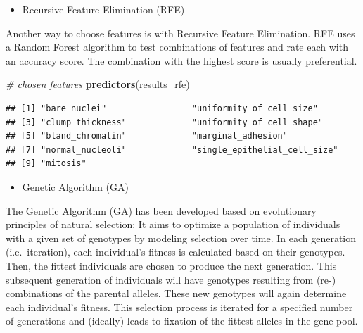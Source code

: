\documentclass[]{article}
\newenvironment{Shaded}{\begin{snugshade}}{\end{snugshade}}
\newcommand{\KeywordTok}[1]{\textcolor[rgb]{0.13,0.29,0.53}{\textbf{{#1}}}}
\newcommand{\DecValTok}[1]{\textcolor[rgb]{0.00,0.00,0.81}{{#1}}}
\newcommand{\StringTok}[1]{\textcolor[rgb]{0.31,0.60,0.02}{{#1}}}
\newcommand{\CommentTok}[1]{\textcolor[rgb]{0.56,0.35,0.01}{\textit{{#1}}}}
\newcommand{\NormalTok}[1]{{#1}}
\providecommand{\tightlist}{%
  \setlength{\itemsep}{0pt}\setlength{\parskip}{0pt}}
\begin{document}
\begin{Shaded}
\end{Shaded}

\begin{itemize}
\tightlist
\item
  Recursive Feature Elimination (RFE)
\end{itemize}

Another way to choose features is with Recursive Feature Elimination.
RFE uses a Random Forest algorithm to test combinations of features and
rate each with an accuracy score. The combination with the highest score
is usually preferential.

\begin{Shaded}
\begin{Highlighting}[]
\CommentTok{# chosen features}
\KeywordTok{predictors}\NormalTok{(results_rfe)}
\end{Highlighting}
\end{Shaded}

\begin{verbatim}
## [1] "bare_nuclei"                 "uniformity_of_cell_size"    
## [3] "clump_thickness"             "uniformity_of_cell_shape"   
## [5] "bland_chromatin"             "marginal_adhesion"          
## [7] "normal_nucleoli"             "single_epithelial_cell_size"
## [9] "mitosis"
\end{verbatim}

\begin{Shaded}
\end{Shaded}

\begin{itemize}
\tightlist
\item
  Genetic Algorithm (GA)
\end{itemize}

The Genetic Algorithm (GA) has been developed based on evolutionary
principles of natural selection: It aims to optimize a population of
individuals with a given set of genotypes by modeling selection over
time. In each generation (i.e.~iteration), each individual's fitness is
calculated based on their genotypes. Then, the fittest individuals are
chosen to produce the next generation. This subsequent generation of
individuals will have genotypes resulting from (re-) combinations of the
parental alleles. These new genotypes will again determine each
individual's fitness. This selection process is iterated for a specified
number of generations and (ideally) leads to fixation of the fittest
alleles in the gene pool.
\end{document}
